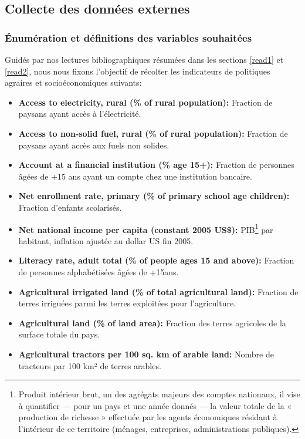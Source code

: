 	\subsection{Collecte des données externes}
	\subsubsection{Énumération et définitions des variables souhaitées }\label{exoList}
			Guidés par nos lectures bibliographiques résumées dans les sections \ref{read1} et \ref{read2}, nous nous fixons l'objectif de récolter les indicateurs de politiques agraires et socioéconomiques suivants:
	\begin{itemize}
		\item \textbf{ Access to electricity, rural (\% of rural population):} Fraction de paysans ayant accès à l'électricité.
		\item \textbf{ Access to non-solid fuel, rural (\% of rural population):} Fraction de paysans ayant accès aux fuels non solides.
		\item \textbf{ Account at a financial institution (\% age 15+):} Fraction de personnes âgées de +15 ans ayant un compte chez une institution bancaire.
		\item \textbf{ Net enrollment rate, primary (\% of primary school age children):} Fraction d'enfants scolarisés.
		\item \textbf{ Net national income per capita (constant 2005 US\$):} PIB\footnote{Produit intérieur brut, un des agrégats majeurs des comptes nationaux, il vise à quantifier — pour un pays et une année donnés — la valeur totale de la « production de richesse » effectuée par les agents économiques résidant à l’intérieur de ce territoire (ménages, entreprises, administrations publiques).} par habitant, inflation ajustée au dollar US fin 2005.
		\item \textbf{ Literacy rate, adult total (\% of people ages 15 and above):} Fraction de personnes alphabétisées âgées de +15ans.
		\item \textbf{ Agricultural irrigated land (\% of total agricultural land):} Fraction de terres irriguées parmi les terres exploitées pour l'agriculture.
		\item \textbf{ Agricultural land (\% of land area):} Fraction des terres agricoles de la surface totale du pays.
		\item \textbf{ Agricultural tractors per 100 sq. km of arable land:} Nombre de tracteurs par 100 km² de terres arables.

\end{itemize}

